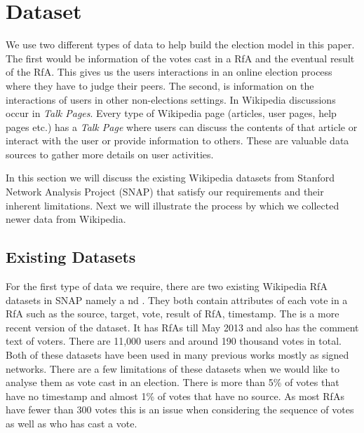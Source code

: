 \section{Dataset}
\label{sec:dataset}

We use two different types of data to help build the election model in this paper. The first would be information of the votes cast in a RfA and the eventual result of the RfA. This gives us the users interactions in an online election process where they have to judge their peers. The second, is information on the interactions of users in other non-elections settings. In Wikipedia discussions occur in \textit{Talk Pages}. Every type of Wikipedia page (articles, user pages, help pages etc.) has a \textit{Talk Page} where users can discuss the contents of that article or interact with the user or provide information to others. These are valuable data sources to gather more details on user activities.

In this section we will discuss the existing Wikipedia datasets from Stanford Network Analysis Project (SNAP) \cite{snapnets} that satisfy our requirements and their inherent limitations. Next we will illustrate the process by which we collected newer data from Wikipedia.


\subsection{Existing Datasets}
For the first type of data we require, there are two existing Wikipedia RfA datasets in SNAP namely \wikielect a
nd \wikirfa. They both contain attributes of each vote in a RfA such as the source, target, vote, result of RfA, timestamp. The \wikirfa is a more recent version of the \wikielect dataset. It has RfAs till May 2013 and also has the comment text of voters. There are 11,000 users and around 190 thousand votes in total. Both of these datasets have been used in many previous works mostly as signed networks. There are a few limitations of these datasets when we would like to analyse them as vote cast in an election. There is more than 5\% of \wikirfa votes that have no timestamp and almost 1\% of votes that have no source. As most RfAs have fewer than 300 votes this is an issue when considering the sequence of votes as well as who has cast a vote.

